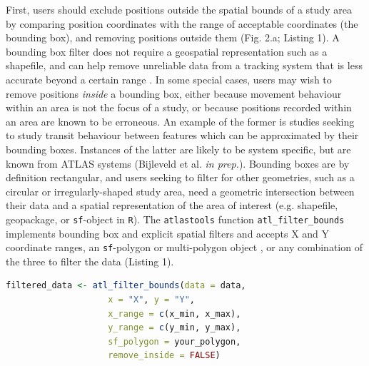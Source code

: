 \documentclass[10pt,paper=a4,headings=standardclasses
]{scrartcl}
\begin{document}
First, users should exclude positions outside the spatial bounds of a study area by comparing position coordinates with the range of acceptable coordinates (the bounding box), and removing positions outside them (Fig. 2.a; Listing 1). 
A bounding box filter does not require a geospatial representation such as a shapefile, and can help remove unreliable data from a tracking system that is less accurate beyond a certain range \citep[e.g. in ATLAS systems][]{beardsworth2021}.
In some special cases, users may wish to remove positions \textit{inside} a bounding box, either because movement behaviour within an area is not the focus of a study, or because positions recorded within an area are known to be erroneous.
An example of the former is studies seeking to study transit behaviour between features which can be approximated by their bounding boxes. 
Instances of the latter are likely to be system specific, but are known from ATLAS systems (Bijleveld et al. \textit{in prep.}). 
Bounding boxes are by definition rectangular, and users seeking to filter for other geometries, such as a circular or irregularly-shaped study area, need a geometric intersection between their data and a spatial representation of the area of interest (e.g. shapefile, geopackage, or \texttt{sf}-object in \texttt{R}).
The \texttt{atlastools} function \texttt{atl\_filter\_bounds} implements bounding box and explicit spatial filters and accepts X and Y coordinate ranges, an \texttt{sf}-polygon or multi-polygon object \citep{pebesma2018}, or any combination of the three to filter the data (Listing 1).

\begin{lstlisting}[float,floatplacement=h!,language=R, style=customR, caption = {
    The \texttt{atl\_filter\_bounds} function filters on an area defined by coordinate ranges, a polygon, or all three; it can remove positions outside (\texttt{remove\_inside = FALSE}), or within the area (\texttt{remove\_inside = TRUE}).
    The arguments \texttt{x} and \texttt{y} determine the X and Y coordinate columns, \texttt{x\_range} and \texttt{y\_range} are the filter bounds in a coordinate reference system in metres, and the data can be filtered by an \texttt{sf-(MULTI)POLYGON} can be passed using the \texttt{sf\_polygon} argument. 
    The output is a \texttt{data.table}, which must be saved as an object (here, \texttt{filtered\_data}).}]
filtered_data <- atl_filter_bounds(data = data,
                    x = "X", y = "Y",
                    x_range = c(x_min, x_max),
                    y_range = c(y_min, y_max),
                    sf_polygon = your_polygon,
                    remove_inside = FALSE)
\end{lstlisting}
\end{document}
